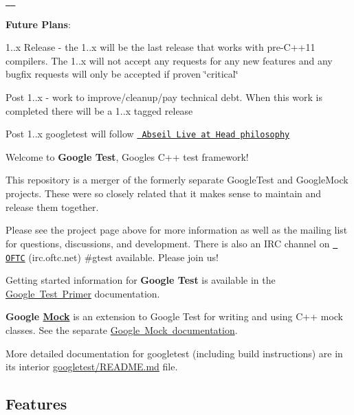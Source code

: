 \href{https://travis-ci.org/google/googletest}{\texttt{ }} \href{https://ci.appveyor.com/project/GoogleTestAppVeyor/googletest/branch/master}{\texttt{ }}

{\bfseries{Future Plans}}\+:
\begin{DoxyItemize}
\item 1..\+x Release -\/ the 1..\+x will be the last release that works with pre-\/\+C++11 compilers. The 1..\+x will not accept any requests for any new features and any bugfix requests will only be accepted if proven \char`\"{}critical\char`\"{}
\item Post 1..\+x -\/ work to improve/cleanup/pay technical debt. When this work is completed there will be a 1..\+x tagged release
\item Post 1..\+x googletest will follow \href{https://abseil.io/about/philosophy}{\texttt{ Abseil Live at Head philosophy}}
\end{DoxyItemize}

Welcome to {\bfseries{Google Test}}, Google\textquotesingle{}s C++ test framework!

This repository is a merger of the formerly separate Google\+Test and Google\+Mock projects. These were so closely related that it makes sense to maintain and release them together.

Please see the project page above for more information as well as the mailing list for questions, discussions, and development. There is also an I\+RC channel on \href{https://webchat.oftc.net/}{\texttt{ O\+F\+TC}} (irc.\+oftc.\+net) \#gtest available. Please join us!

Getting started information for {\bfseries{Google Test}} is available in the \mbox{\hyperlink{primer_8md}{Google Test Primer}} documentation.

{\bfseries{Google \mbox{\hyperlink{classMock}{Mock}}}} is an extension to Google Test for writing and using C++ mock classes. See the separate \mbox{\hyperlink{cmake-build-debug_2googletest-src_2googlemock_2README_8md}{Google Mock documentation}}.

More detailed documentation for googletest (including build instructions) are in its interior \mbox{\hyperlink{cmake-build-debug_2googletest-src_2googletest_2README_8md}{googletest/\+R\+E\+A\+D\+ME.md}} file.

\subsection*{Features}


